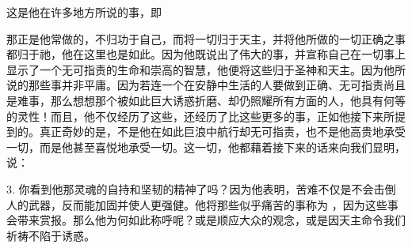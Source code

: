 这是他在许多地方所说的事，即 \par

那正是他常做的，不归功于自己，而将一切归于天主，并将他所做的一切正确之事都归于祂，他在这里也是如此。因为他既说出了伟大的事，并宣称自己在一切事上显示了一个无可指责的生命和崇高的智慧，他便将这些归于圣神和天主。因为他所说的那些事并非平庸。因为若连一个在安静中生活的人要做到正确、无可指责尚且是难事，那么想想那个被如此巨大诱惑折磨、却仍照耀所有方面的人，他具有何等的灵性！而且，他不仅经历了这些，还经历了比这些更多的事，正如他接下来所提到的。真正奇妙的是，不是他在如此巨浪中航行却无可指责，也不是他高贵地承受一切，而是他甚至喜悦地承受一切。这一切，他都藉着接下来的话来向我们显明，说：\par

\par

3. 你看到他那灵魂的自持和坚韧的精神了吗？因为他表明，苦难不仅是不会击倒人的武器，反而能加固并使人更强健。他将那些似乎痛苦的事称为 ，因为这些事会带来赏报。那么他为何如此称呼呢？或是顺应大众的观念，或是因天主命令我们祈祷不陷于诱惑。\par


\subsection{}

\par

